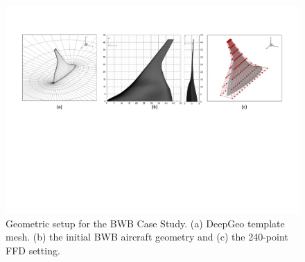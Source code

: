 \begin{figure}[ht]
    \begin{center}
        \includegraphics[width=1\linewidth]{chapter5/fig/bwb_template_mesh_initial_geometry.pdf}
    \end{center}
    \caption{
        \small Geometric setup for the BWB Case Study. (a) DeepGeo template mesh. (b) the initial BWB aircraft geometry and (c) the 240-point FFD setting.
    }
    \label{ch5:fig:cs3_template_mesh}
\end{figure}

